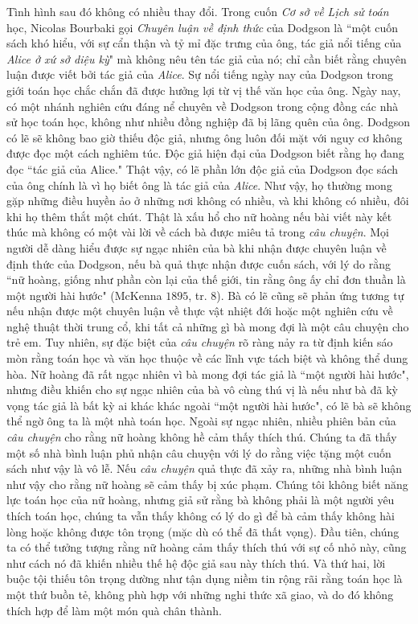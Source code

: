 \begin{multicols}{2}
	Tình hình sau đó không có nhiều thay đổi. Trong cuốn \textit{Cơ sở về Lịch sử toán} học, Nicolas Bourbaki gọi \textit{Chuyên luận về định thức} của Dodgson  là  ``một cuốn sách khó hiểu, với sự cẩn thận và tỷ mỉ đặc trưng của ông,  tác giả nổi tiếng của \textit{Alice ở xứ sở diệu kỳ}"  mà không nêu tên tác giả của nó; chỉ cần biết rằng chuyên luận được viết bởi tác giả của \textit{Alice}. Sự nổi tiếng ngày nay của Dodgson trong giới toán học chắc chắn đã được hưởng lợi từ vị thế văn học của ông. Ngày nay, có một nhánh nghiên cứu đáng nể chuyên về Dodgson trong cộng đồng các nhà sử học toán học, không như nhiều đồng nghiệp đã bị lãng quên của ông. Dodgson có lẽ sẽ không bao giờ thiếu độc giả, nhưng ông luôn đối mặt với nguy cơ không được đọc một cách nghiêm túc. Độc giả hiện đại của Dodgson biết rằng họ đang đọc ``tác giả của Alice." Thật vậy, có lẽ  phần lớn độc giả của Dodgson đọc sách của ông chính là vì họ biết ông là tác giả của \textit{Alice}. Như vậy, họ thường mong gặp những điều huyền ảo ở những nơi không có nhiều, và khi không có nhiều, đôi khi họ thêm thắt một chút.
	\vskip 0.1cm
	Thật là xấu hổ cho nữ hoàng nếu bài viết này kết thúc mà không có một vài lời về cách bà được miêu tả trong \textit{câu chuyện}. Mọi người dễ dàng hiểu được sự ngạc nhiên của bà khi nhận được chuyên luận về định thức của Dodgson, nếu bà quả thực nhận được cuốn sách, với lý do rằng ``nữ hoàng, giống như phần còn lại của thế giới,  tin rằng ông ấy chỉ đơn thuần là một người hài hước" (McKenna $1895$, tr. $8$). Bà có lẽ cũng sẽ phản ứng tương tự nếu nhận được một chuyên luận về thực vật nhiệt đới hoặc một nghiên cứu về nghệ thuật thời trung cổ, khi tất cả những gì bà mong đợi là một câu chuyện cho trẻ em. Tuy nhiên, sự đặc biệt của \textit{câu chuyện} rõ ràng nảy ra từ định kiến sáo mòn rằng toán học và văn học thuộc về các lĩnh vực tách biệt và không thể dung hòa. Nữ hoàng đã rất ngạc nhiên vì bà mong đợi tác giả là ``một người hài hước", nhưng điều khiến cho sự ngạc nhiên của bà vô cùng thú vị là nếu như bà đã kỳ vọng tác giả là bất kỳ ai khác khác ngoài ``một người hài hước", có lẽ bà sẽ không thể ngờ ông ta là một nhà toán học.
	\vskip 0.1cm
	Ngoài sự ngạc nhiên, nhiều phiên bản của \textit{câu chuyện} cho rằng nữ hoàng không hề cảm thấy thích thú. Chúng ta đã thấy một số nhà bình luận phủ nhận câu chuyện với lý do rằng việc tặng một cuốn sách như vậy là vô lễ. Nếu \textit{câu chuyện} quả thực đã xảy ra, những nhà bình luận như vậy cho rằng nữ hoàng sẽ cảm thấy bị xúc phạm. Chúng tôi không biết năng lực toán học của nữ hoàng, nhưng giả sử rằng bà không phải là một người yêu thích toán học, chúng ta vẫn thấy không có lý do gì để bà cảm thấy không hài lòng hoặc không được tôn trọng (mặc dù có thể đã thất vọng). Đầu tiên, chúng ta có thể tưởng tượng rằng nữ hoàng cảm thấy thích thú với sự cố nhỏ này, cũng như cách nó đã khiến nhiều thế hệ độc giả sau này thích thú. Và thứ hai, lời buộc tội  thiếu tôn trọng dường như tận dụng niềm tin rộng rãi rằng toán học là một thứ buồn tẻ, không phù hợp với những nghi thức xã giao, và do đó không thích hợp để làm  một món quà chân thành.

\end{multicols}
